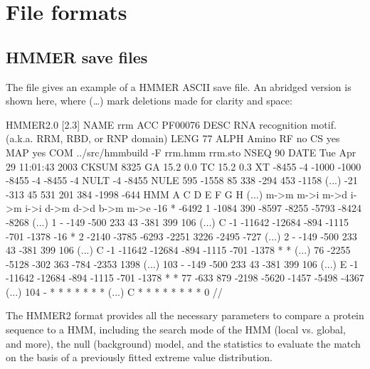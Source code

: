 \section{File formats}
\label{section:formats}

\subsection{HMMER save files}
\label{section:savefiles}

The file  gives an example of a HMMER ASCII save
file. An abridged version is shown here, where (\ldots) mark deletions
made for clarity and space:

\begin{sreoutput}
HMMER2.0  [2.3]
NAME  rrm
ACC   PF00076
DESC  RNA recognition motif. (a.k.a. RRM, RBD, or RNP domain)
LENG  77
ALPH  Amino
RF    no
CS    yes
MAP   yes
COM   ../src/hmmbuild -F rrm.hmm rrm.sto
NSEQ  90
DATE  Tue Apr 29 11:01:43 2003
CKSUM 8325
GA    15.2 0.0
TC    15.2 0.3
XT      -8455     -4  -1000  -1000  -8455     -4  -8455     -4 
NULT      -4  -8455
NULE     595  -1558     85    338   -294    453  -1158    (...)
   -21   -313     45    531    201    384  -1998   -644 
HMM        A      C      D      E      F      G      H    (...)
         m->m   m->i   m->d   i->m   i->i   d->m   d->d   b->m   m->e
          -16      *  -6492
     1  -1084    390  -8597  -8255  -5793  -8424  -8268   (...)  1
     -   -149   -500    233     43   -381    399    106   (...)
     C     -1 -11642 -12684   -894  -1115   -701  -1378    -16      * 
     2  -2140  -3785  -6293  -2251   3226  -2495   -727   (...)  2
     -   -149   -500    233     43   -381    399    106   (...)
     C     -1 -11642 -12684   -894  -1115   -701  -1378      *      * 
(...)
    76  -2255  -5128   -302    363   -784  -2353   1398   (...)  103
     -   -149   -500    233     43   -381    399    106   (...)
     E     -1 -11642 -12684   -894  -1115   -701  -1378      *      * 
    77   -633    879  -2198  -5620  -1457  -5498  -4367   (...)  104
     -      *      *      *      *      *      *      *   (...)
     C      *      *      *      *      *      *      *      *      0 
//
\end{sreoutput}

The HMMER2 format provides all the necessary parameters to compare a
protein sequence to a HMM, including the search mode of the HMM (local
vs. global, and more), the null (background) model, and the statistics
to evaluate the match on the basis of a previously fitted extreme
value distribution.

